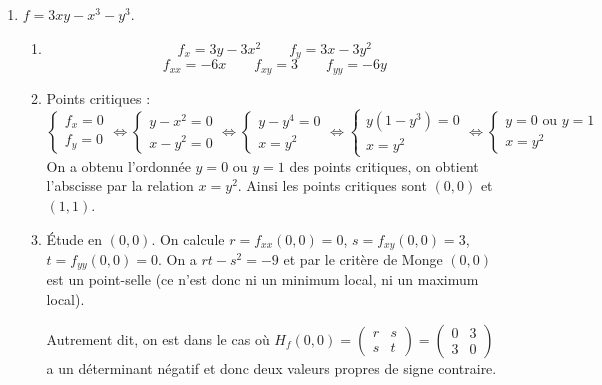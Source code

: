 \documentclass[11pt,a4paper]{article}
\theoremstyle{exostyle}
\begin{document}
\begin{enumerate}
	
	\item $f = 3xy - x^3 - y^3$.
	
	\begin{enumerate}
		\item
	\[
	f_x = 3y-3x^2
	\qquad
	f_y = 3x-3y^2
	\]
	\[
	f_{xx} = -6x
	\qquad 
	f_{xy}= 3
	\qquad 
	f_{yy}= -6y
	\]
	
	\item Points critiques :
	\[
	\left\{
	\begin{array}{l}
	f_x = 0 \\
	f_y = 0 
	\end{array}
	\right.
	\iff
	\left\{
	\begin{array}{l}
	y-x^2 = 0 \\	
	x-y^2 = 0 
	\end{array}
	\right.	
	\iff
	\left\{
	\begin{array}{l}
	y-y^4 = 0 \\		
	x=y^2 
	\end{array}
	\right.	
	\iff
	\left\{
	\begin{array}{l}
		y(1-y^3) = 0 \\
		x=y^2
	\end{array}
	\right.	
	\iff
	\left\{
	\begin{array}{l}
		y = 0 \text{ ou } y = 1		\\
		x=y^2 
	\end{array}
	\right.			
	\]	
	On a obtenu l'ordonnée $y=0$ ou $y=1$ des points critiques, on obtient l'abscisse par la relation $x=y^2$.
	Ainsi les points critiques sont $(0,0)$ et $(1,1)$.
	
	\item Étude en $(0,0)$.
	On calcule $r=f_{xx}(0,0) = 0$, $s=f_{xy}(0,0) = 3$, $t=f_{yy}(0,0) = 0$.
	On a $rt-s^2 = -9$ et par le critère de Monge $(0,0)$ est un point-selle (ce n'est donc ni un minimum local, ni un maximum local).
	
	Autrement dit, on est dans le cas où $H_f(0,0) = \begin{pmatrix}r&s\\s&t\end{pmatrix}=\begin{pmatrix}0&3\\3&0\end{pmatrix}$
	a un déterminant négatif et donc deux valeurs propres de signe contraire.
	


\end{enumerate}
\end{enumerate}
\end{document}
